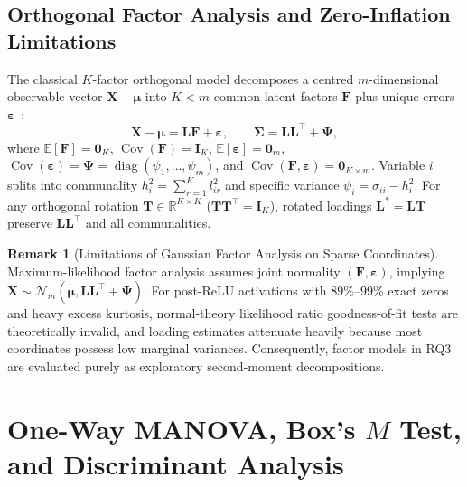 \documentclass[12pt, a4paper, oneside]{report}
\theoremstyle{definition}
\newtheorem{remark}{Remark}[chapter]
\newcommand{\vect}[1]{\mathbf{#1}}
\newcommand{\mat}[1]{\mathbf{#1}}
\newcommand{\diag}{\operatorname{diag}}
\newcommand{\E}{\mathbb{E}}
\newcommand{\Cov}{\operatorname{Cov}}
\newcommand{\R}{\mathbb{R}}
\begin{document}
\subsection{Orthogonal Factor Analysis and Zero-Inflation Limitations}

The classical $K$-factor orthogonal model decomposes a centred $m$-dimensional observable vector $\vect{X} - \boldsymbol{\mu}$ into $K < m$ common latent factors $\vect{F}$ plus unique errors $\boldsymbol{\varepsilon}$~\cite{johnson2014applied}:
\begin{equation}
    \vect{X} - \boldsymbol{\mu} = \mat{L}\vect{F} + \boldsymbol{\varepsilon},
    \qquad
    \mat{\Sigma} = \mat{L}\mat{L}^\top + \mat{\Psi},
    \label{eq:factor_model}
\end{equation}
where $\E[\vect{F}] = \vect{0}_K$, $\Cov(\vect{F}) = \mat{I}_K$, $\E[\boldsymbol{\varepsilon}] = \vect{0}_m$, $\Cov(\boldsymbol{\varepsilon}) = \mat{\Psi} = \diag(\psi_1, \dots, \psi_m)$, and $\Cov(\vect{F}, \boldsymbol{\varepsilon}) = \mat{0}_{K \times m}$. Variable $i$ splits into communality $h_i^2 = \sum_{r=1}^K l_{ir}^2$ and specific variance $\psi_i = \sigma_{ii} - h_i^2$. For any orthogonal rotation $\mat{T} \in \R^{K \times K}$ ($\mat{T}\mat{T}^\top = \mat{I}_K$), rotated loadings $\mat{L}^* = \mat{L}\mat{T}$ preserve $\mat{L}\mat{L}^\top$ and all communalities.

\begin{remark}[Limitations of Gaussian Factor Analysis on Sparse Coordinates]
Maximum-likelihood factor analysis assumes joint normality $(\vect{F}, \boldsymbol{\varepsilon})$, implying $\vect{X} \sim \mathcal{N}_m(\boldsymbol{\mu}, \mat{L}\mat{L}^\top + \mat{\Psi})$. For post-ReLU activations with $89\%\text{--}99\%$ exact zeros and heavy excess kurtosis, normal-theory likelihood ratio goodness-of-fit tests are theoretically invalid, and loading estimates attenuate heavily because most coordinates possess low marginal variances. Consequently, factor models in RQ3 are evaluated purely as exploratory second-moment decompositions.
\end{remark}

\section{One-Way MANOVA, Box's \texorpdfstring{$M$}{M} Test, and Discriminant Analysis}
\end{document}
